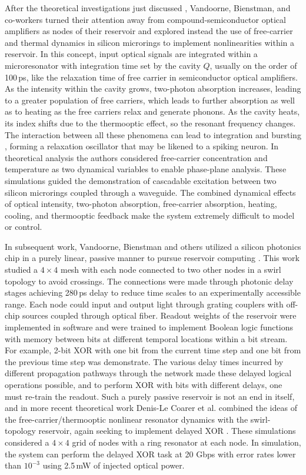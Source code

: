 After the theoretical investigations just discussed \cite{vadi2008,vada2011}, Vandoorne, Bienstman, and co-workers turned their attention away from compound-semiconductor optical amplifiers as nodes of their reservoir and explored instead the use of free-carrier and thermal dynamics in silicon microrings to implement nonlinearities within a reservoir. In this concept, input optical signals are integrated within a microresonator with integration time set by the cavity $Q$, usually on the order of 100\,ps, like the relaxation time of free carrier in semiconductor optical amplifiers. As the intensity within the cavity grows, two-photon absorption increases, leading to a greater population of free carriers, which leads to further absorption as well as to heating as the free carriers relax and generate phonons. As the cavity heats, its index shifts due to the thermooptic effect, so the resonant frequency changes. The interaction between all these phenomena can lead to integration and bursting \cite{jobo2006}, forming a relaxation oscillator that may be likened to a spiking neuron. In theoretical analysis the authors considered free-carrier concentration and temperature as two dynamical variables to enable phase-plane analysis. These simulations guided the demonstration of cascadable excitation between two silicon microrings coupled through a waveguide. The combined dynamical effects of optical intensity, two-photon absorption, free-carrier absorption, heating, cooling, and thermooptic feedback make the system extremely difficult to model or control.

In subsequent work, Vandoorne, Bienstman and others utilized a silicon photonics chip in a purely linear, passive manner to pursue reservoir computing \cite{vame2014}. This work studied a $4\times 4$ mesh with each node connected to two other nodes in a swirl topology to avoid crossings. The connections were made through photonic delay stages achieving 280\,ps delay to reduce time scales to an experimentally accessible range. Each node could input and output light through grating couplers with off-chip sources coupled through optical fiber. Readout weights of the reservoir were implemented in software and were trained to implement Boolean logic functions with memory between bits at different temporal locations within a bit stream. For example, 2-bit XOR with one bit from the current time step and one bit from the previous time step was demonstrate. The various delay times incurred by different propagation pathways through the network made these delayed logical operations possible, and to perform XOR with bits with different delays, one must re-train the readout. Such a purely passive reservoir is not an end in itself, and in more recent theoretical work Denis-Le Coarer et al. combined the ideas of the free-carrier/thermooptic nonlinear resonator dynamics with the swirl-topology reservoir, again seeking to implement delayed XOR \cite{desc2018}. These simulations considered a $4\times 4$ grid of nodes with a ring resonator at each node. In simulation, the system can perform the delayed XOR task at 20 Gbps with error rates lower than $10^{-3}$ using 2.5\,mW of injected optical power. 

